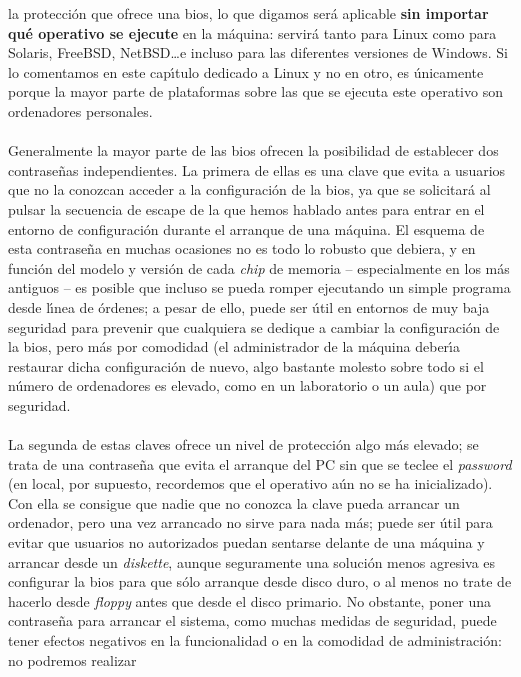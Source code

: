 la protecci\'on que ofrece una {\sc bios}, lo que digamos ser\'a aplicable {\bf 
sin importar qu\'e operativo se ejecute} en la m\'aquina: servir\'a tanto para 
Linux como para Solaris, FreeBSD, NetBSD\ldots e incluso para las diferentes 
versiones de Windows. Si lo comentamos en este cap\'{\i}tulo dedicado a Linux
y no en otro, es \'unicamente porque la mayor parte de plataformas sobre las
que se ejecuta este operativo son ordenadores personales.\\
\\Generalmente la mayor parte de las {\sc bios} ofrecen la posibilidad de 
establecer dos contrase\~nas independientes. La primera de ellas es una clave
que evita a usuarios que no la conozcan acceder a la configuraci\'on de la {\sc
bios}, ya que se solicitar\'a al pulsar la secuencia de escape de la que hemos 
hablado antes para entrar en el entorno de configuraci\'on durante el arranque
de una m\'aquina. El esquema de esta contrase\~na en muchas ocasiones no es 
todo lo robusto que debiera, y en funci\'on del modelo y versi\'on de cada
{\it chip} de memoria -- especialmente en los m\'as antiguos -- es posible que 
incluso se pueda romper ejecutando un simple programa desde l\'{\i}nea de 
\'ordenes; a pesar de ello, puede ser \'util en entornos de muy baja seguridad
para prevenir que cualquiera se dedique a cambiar la configuraci\'on de la {\sc 
bios}, pero m\'as por comodidad (el administrador de la m\'aquina deber\'{\i}a
restaurar dicha configuraci\'on de nuevo, algo bastante molesto sobre todo si
el n\'umero de ordenadores es elevado, como en un laboratorio o un aula) que
por seguridad.\\
\\La segunda de estas claves ofrece un nivel de protecci\'on algo m\'as elevado;
se trata de una contrase\~na que evita el arranque del PC sin que se teclee el
{\it password} (en local, por supuesto, recordemos que el operativo a\'un no se
ha inicializado). Con ella se consigue que nadie que no conozca la clave pueda
arrancar un ordenador, pero una vez arrancado no sirve para nada m\'as; puede
ser \'util para evitar que usuarios no autorizados puedan sentarse delante de
una m\'aquina y arrancar desde un {\it diskette}, aunque seguramente una
soluci\'on menos agresiva es configurar la {\sc bios} para que s\'olo arranque
desde disco duro, o al menos no trate de hacerlo desde {\it floppy} antes que
desde el disco primario. No obstante, poner una contrase\~na para arrancar el
sistema, como muchas medidas de seguridad, puede tener efectos negativos en la 
funcionalidad o en la comodidad de administraci\'on: no podremos realizar 
